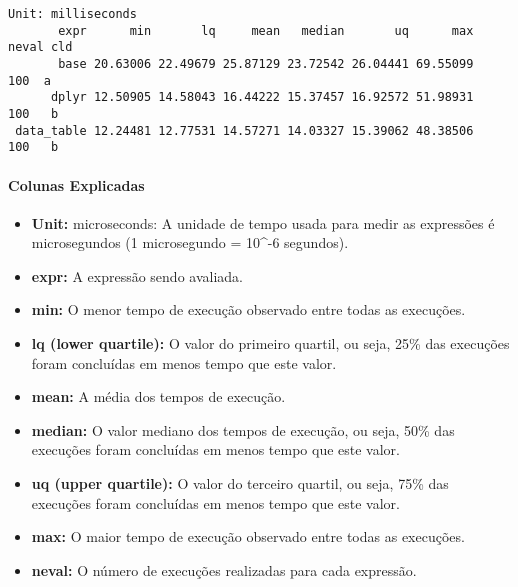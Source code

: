 \documentclass[
]{article}
\begin{document}
\begin{verbatim}
Unit: milliseconds
       expr      min       lq     mean   median       uq      max neval cld
       base 20.63006 22.49679 25.87129 23.72542 26.04441 69.55099   100  a 
      dplyr 12.50905 14.58043 16.44222 15.37457 16.92572 51.98931   100   b
 data_table 12.24481 12.77531 14.57271 14.03327 15.39062 48.38506   100   b
\end{verbatim}

\paragraph{Colunas Explicadas}\label{colunas-explicadas}

\begin{itemize}
\item
  \textbf{Unit:} microseconds: A unidade de tempo usada para medir as
  expressões é microsegundos (1 microsegundo = 10\^{}-6 segundos).
\item
  \textbf{expr:} A expressão sendo avaliada.
\item
  \textbf{min:} O menor tempo de execução observado entre todas as
  execuções.
\item
  \textbf{lq (lower quartile):} O valor do primeiro quartil, ou seja,
  25\% das execuções foram concluídas em menos tempo que este valor.
\item
  \textbf{mean:} A média dos tempos de execução.
\item
  \textbf{median:} O valor mediano dos tempos de execução, ou seja, 50\%
  das execuções foram concluídas em menos tempo que este valor.
\item
  \textbf{uq (upper quartile):} O valor do terceiro quartil, ou seja,
  75\% das execuções foram concluídas em menos tempo que este valor.
\item
  \textbf{max:} O maior tempo de execução observado entre todas as
  execuções.
\item
  \textbf{neval:} O número de execuções realizadas para cada expressão.
\end{itemize}
\end{document}
